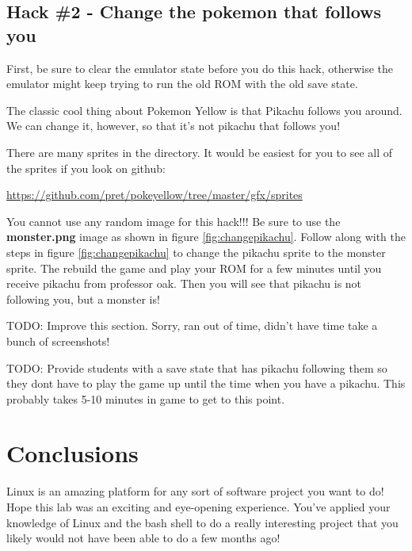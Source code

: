\documentclass[12pt,a4]{article}
\begin{document}
\clearpage

\subsection{Hack \#2 - Change the pokemon that follows you}

First, be sure to clear the emulator state before you do this hack, otherwise the emulator might keep trying to run the old ROM with the old save state.

The classic cool thing about Pokemon Yellow is that Pikachu follows you around. We can change it, however, so that it's not pikachu that follows you!

There are many sprites in the  directory. It would be easiest for you to see all of the sprites if you look on github:

\href{https://github.com/pret/pokeyellow/tree/master/gfx/sprites}{https://github.com/pret/pokeyellow/tree/master/gfx/sprites}

You cannot use any random image for this hack!!! Be sure to use the \textbf{monster.png} image as shown in figure \ref{fig:changepikachu}. Follow along with the steps in figure \ref{fig:changepikachu} to change the pikachu sprite to the monster  sprite. The rebuild the game and play your ROM for a few minutes until you receive pikachu from professor oak. Then you will see that pikachu is not following you, but a monster is!


TODO: Improve this section. Sorry, ran out of time, didn't have time take a bunch of screenshots!

TODO: Provide students with a save state that has pikachu following them so they dont have to play the game up until the time when you have a pikachu. This probably takes 5-10 minutes in game to get to this point.

\clearpage

\section{Conclusions}
Linux is an amazing platform for any sort of software project you want to do! Hope this lab was an exciting and eye-opening experience. You've applied your knowledge of Linux and the bash shell to do a really interesting project that you likely would not have been able to do a few months ago!
\end{document}
